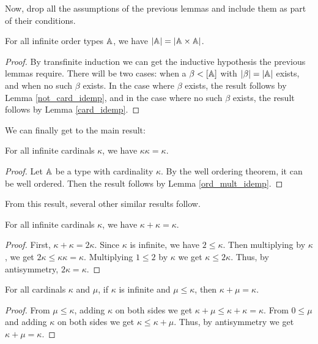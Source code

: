 \documentclass[../../math.tex]{subfiles}
\begin{document}
Now, drop all the assumptions of the previous lemmas and include them as part of
their conditions.

\begin{lemma} \label{ord_mult_idemp}
    For all infinite order types $\mathbb{A}$, we have $|\mathbb{A}| = |\mathbb{A} \times \mathbb{A}|$.
\end{lemma}
\begin{proof}
    By transfinite induction we can get the inductive hypothesis the previous
    lemmas require.  There will be two cases: when a $\beta < [\mathbb{A}]$ with
    $|\beta| = |\mathbb{A}|$ exists, and when no such $\beta$ exists.  In the case where
    $\beta$ exists, the result follows by Lemma \ref{not_card_idemp}, and in the
    case where no such $\beta$ exists, the result follows by Lemma
    \ref{card_idemp}.
\end{proof}

We can finally get to the main result:

\begin{theorem} \label{card_mult_idemp}
    For all infinite cardinals $\kappa$, we have $\kappa\kappa = \kappa$.
\end{theorem}
\begin{proof}
    Let $\mathbb{A}$ be a type with cardinality $\kappa$.  By the well ordering theorem,
    it can be well ordered.  Then the result follows by Lemma
    \ref{ord_mult_idemp}.
\end{proof}

From this result, several other similar results follow.

\begin{theorem} \label{card_plus_idemp}
    For all infinite cardinals $\kappa$, we have $\kappa + \kappa = \kappa$.
\end{theorem}
\begin{proof}
    First, $\kappa + \kappa = 2\kappa$.  Since $\kappa$ is infinite, we have $2
    \leq \kappa$.  Then multiplying by $\kappa$, we get $2\kappa \leq
    \kappa\kappa = \kappa$.  Multiplying $1 \leq 2$ by $\kappa$ we get $\kappa
    \leq 2\kappa$.  Thus, by antisymmetry, $2\kappa = \kappa$.
\end{proof}

\begin{theorem} \label{card_plus_lmax}
    For all cardinals $\kappa$ and $\mu$, if $\kappa$ is infinite and $\mu \leq
    \kappa$, then $\kappa + \mu = \kappa$.
\end{theorem}
\begin{proof}
    From $\mu \leq \kappa$, adding $\kappa$ on both sides we get $\kappa + \mu
    \leq \kappa + \kappa = \kappa$.  From $0 \leq \mu$ and adding $\kappa$ on
    both sides we get $\kappa \leq \kappa + \mu$.  Thus, by antisymmetry we get
    $\kappa + \mu = \kappa$.
\end{proof}
\end{document}
